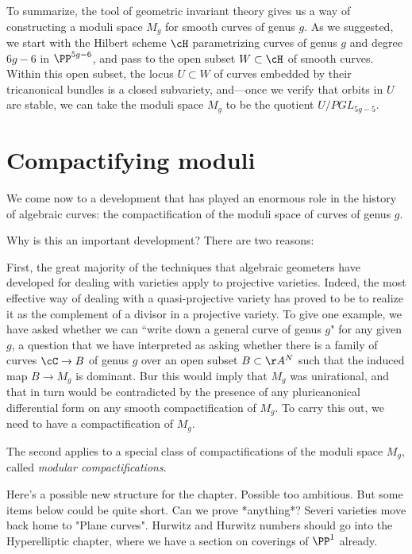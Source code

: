 To summarize, the tool of geometric invariant theory gives us a way of constructing a moduli space $M_g$ for smooth  curves of genus $g$. As we suggested, we start with the Hilbert scheme $\cH$ parametrizing curves of genus $g$ and degree $6g-6$ in $\PP^{5g-6}$, and pass to the open subset $W \subset \cH$ of smooth curves. Within this open subset, the locus $U \subset W$ of curves embedded by their tricanonical bundles is a closed subvariety, and---once we verify that orbits in $U$ are stable, we can take the moduli space $M_g$ to be the quotient $U/PGL_{5g-5}$.

\section{Compactifying moduli}

We come now to a development that has played an enormous role in the history of algebraic curves: the compactification of the moduli space of curves of genus $g$.

Why is this an important development? There are two reasons:

First, the great majority of the techniques that algebraic geometers have developed for dealing with varieties apply to projective varieties. Indeed, the most effective way of dealing with a quasi-projective variety has proved to be to realize it as the complement of a divisor in a projective variety. To give one example, we have asked whether we can ``write down a general curve of genus $g$" for any given $g$, a question that we have interpreted as asking whether there is a family of curves $\cC \to B$ of genus $g$ over an open subset $B \subset \AA^N$ such that the induced map $B \to M_g$ is dominant. Bur this would imply that $M_g$ was unirational, and that in turn would be contradicted by the presence of any pluricanonical differential form on any smooth compactification of $M_g$. To carry this out, we need to have a compactification of $M_g$.

The second applies to a special class of compactifications of the moduli space $M_g$, called \emph{modular compactifications}. 



\newpage

Here's a possible new structure for the chapter. Possible too ambitious. But some items below could be quite short. Can we prove *anything*? Severi varieties move back home to "Plane curves". Hurwitz and Hurwitz numbers should go into the Hyperelliptic chapter, where we have a section on coverings of $\PP^1$ already.

